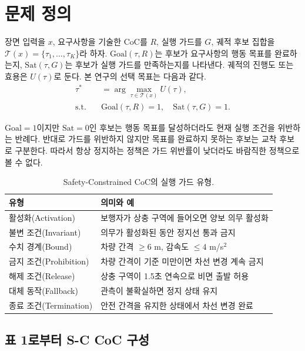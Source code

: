 \section{문제 정의}
\label{sec:problem}

장면 입력을 $x$, 요구사항을 기술한 CoC를 $R$, 실행 가드를 $G$, 궤적 후보 집합을 $\mathcal{T}(x)=\{\tau_1,\ldots,\tau_K\}$라 하자. $\mathrm{Goal}(\tau,R)$는 후보가 요구사항의 행동 목표를 완료하는지, $\mathrm{Sat}(\tau,G)$는 후보가 실행 가드를 만족하는지를 나타낸다. 궤적의 진행도 또는 효용은 $U(\tau)$로 둔다. 본 연구의 선택 목표는 다음과 같다.
\begin{equation}
\begin{aligned}
\tau^*&=\arg\max_{\tau\in\mathcal{T}(x)} U(\tau),\\
\mathrm{s.t.}\quad &\mathrm{Goal}(\tau,R)=1,\quad \mathrm{Sat}(\tau,G)=1.
\end{aligned}
\label{eq:selection}
\end{equation}

$\mathrm{Goal}=1$이지만 $\mathrm{Sat}=0$인 후보는 행동 목표를 달성하더라도 현재 실행 조건을 위반하는 반례다. 반대로 가드를 위반하지 않지만 목표를 완료하지 못하는 후보는 교착 후보로 구분한다. 따라서 항상 정지하는 정책은 가드 위반률이 낮더라도 바람직한 정책으로 볼 수 없다.

\begin{table}[t]
\centering
\caption{Safety-Constrained CoC의 실행 가드 유형.}
\label{tab:taxonomy}
\footnotesize
\begin{tabularx}{\columnwidth}{L{0.30\columnwidth}Y}
\toprule
유형 & 의미와 예 \\
\midrule
활성화(Activation) & 보행자가 상충 구역에 들어오면 양보 의무 활성화 \\
불변 조건(Invariant) & 의무가 활성화된 동안 정지선 통과 금지 \\
수치 경계(Bound) & 차량 간격 $\geq6$ m, 감속도 $\leq4$ m/s$^2$ \\
금지 조건(Prohibition) & 차량 간격이 기준 미만이면 차선 변경 계속 금지 \\
해제 조건(Release) & 상충 구역이 1.5초 연속으로 비면 출발 허용 \\
대체 동작(Fallback) & 관측이 불확실하면 정지 상태 유지 \\
종료 조건(Termination) & 안전 간격을 유지한 상태에서 차선 변경 완료 \\
\bottomrule
\end{tabularx}
\end{table}

\subsection{표 1로부터 S-C CoC 구성}

